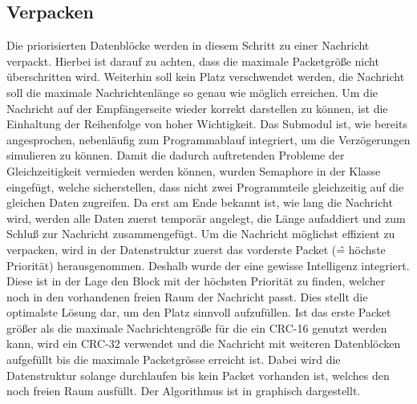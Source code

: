 \lstset{language=pseudo}
\lstset{commentstyle=\textit}


\subsection{Verpacken}

Die priorisierten Datenblöcke werden in diesem Schritt zu einer Nachricht
verpackt. Hierbei ist darauf zu achten, dass die maximale Packetgröße
nicht überschritten wird. Weiterhin soll kein Platz verschwendet werden, \dahe
die Nachricht soll die maximale Nachrichtenlänge so genau wie möglich erreichen.
Um die Nachricht auf der Empfängerseite wieder korrekt darstellen zu können, ist
die Einhaltung der Reihenfolge von hoher Wichtigkeit. \newline
Das Submodul ist, wie bereits angesprochen, nebenläufig zum Programmablauf
integriert, um die Verzögerungen simulieren zu können. Damit die
dadurch auftretenden Probleme der Gleichzeitigkeit vermieden werden können,
wurden Semaphore in der Klasse 
eingefügt, welche sicherstellen, dass nicht zwei Programmteile gleichzeitig auf
die gleichen Daten zugreifen. Da erst am Ende bekannt ist, wie lang die
Nachricht wird, werden alle Daten zuerst temporär angelegt, die Länge aufaddiert
und zum Schluß zur Nachricht zusammengefügt.
Um die Nachricht möglichst effizient zu verpacken, wird in der
Datenstruktur  zuerst das vorderste Packet
(\^= höchste Priorität) herausgenommen. Deshalb wurde der
 eine gewisse Intelligenz integriert.
Diese ist in der Lage den Block mit der höchsten Priorität zu finden, welcher
noch in den vorhandenen freien Raum der Nachricht passt. Dies stellt die
optimalste Lösung dar, um den Platz sinnvoll aufzufüllen. \newline 
Ist das erste Packet größer als die maximale Nachrichtengröße für die ein CRC-16
genutzt werden kann, wird ein CRC-32 verwendet und die Nachricht mit weiteren
Datenblöcken aufgefüllt bis die maximale Packetgrösse erreicht ist. Dabei wird
die Datenstruktur  solange
durchlaufen bis kein Packet vorhanden ist, welches den noch freien Raum
ausfüllt. \newline 
Der Algorithmus ist in  graphisch dargestellt.

